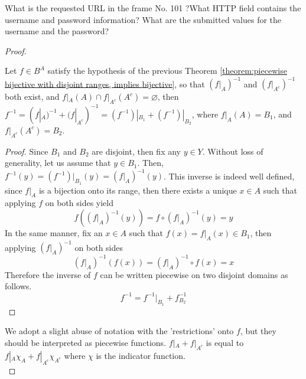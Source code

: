 \documentclass[../../main.tex]{subfiles}
\begin{document}
\begin{wts}
What is the requested URL in the frame No. 101 ?What HTTP field contains the username and password information? What are the submitted values for the username and the password?
\end{wts}
\begin{proof}
\begin{wts}\label{theorem:piecewise bijections with disjoint ranges, inverse is the sum of piecewise inverses}
Let $f\in B^A$ satisfy the hypothesis of the previous Theorem \ref{theorem:piecewise bijective with disjoint ranges, implies bijective}, so that $(f|_{A})^{-1}$ and $(f|_{A^c})^{-1}$ both exist, and $f|_A(A)\cap f|_{A^c}(A^c)=\varnothing$, then $f^{-1} = (f|_{A})^{-1} + (f|_{A^c})^{-1} = (f^{-1})|_{B_1} + (f^{-1})|_{B_2}$, where $f|_{A}(A) = B_1$, and $f|_{A^c}(A^c)=B_2$.
\end{wts}
\begin{proof}
    Since $B_1$ and $B_2$ are disjoint, then fix any $y\in Y$. Without loss of generality, let us assume that $y\in B_1$. Then, $f^{-1}(y) = (f^{-1})|_{B_1}(y) = (f|_{A})^{-1}(y)$. This inverse is indeed well defined, since $f|_{A}$ is a bijection onto its range, then there exists a unique $x\in A$ such that applying $f$ on both sides yield
    \[
    f\left((f|_{A})^{-1}(y)\right) =f\circ (f|_A)^{-1} (y)= y
    \]
    In the same manner, fix an $x\in A$ such that $f(x)=f|_{A}(x)\in B_1$, then applying $(f|_{A})^{-1}$ on both sides
    \[
    (f|_A)^{-1}\left(f(x)\right) = (f|_{A})^{-1}\circ f (x)= x
    \]
    Therefore the inverse of $f$ can be written piecewise on two disjoint domains as follows.
    \[
    f^{-1} = f^{-1}|_{B_1} + f^{-1}_{B_2}
    \]
\end{proof}
\remark We adopt a slight abuse of notation with the 'restrictions' onto $f$, but they should be interpreted as piecewise functions. $f|_A + f|_{A^c}$ is equal to $f|_{A}\chi_A + f|_{A^c}\chi_{A^c}$ where $\chi$ is the indicator function.\\
\end{proof}
\end{document}
